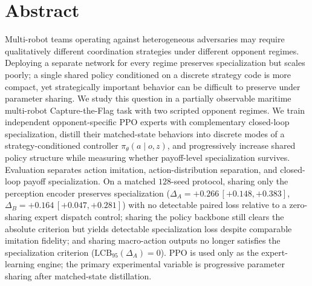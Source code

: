 \section*{Abstract}

Multi-robot teams operating against heterogeneous adversaries may require
qualitatively different coordination strategies under different opponent
regimes. Deploying a separate network for every regime preserves specialization
but scales poorly; a single shared policy conditioned on a discrete strategy
code is more compact, yet strategically important behavior can be difficult to
preserve under parameter sharing. We study this question in a partially
observable maritime multi-robot Capture-the-Flag task with two scripted opponent
regimes. We train independent opponent-specific PPO experts with complementary
closed-loop specialization, distill their matched-state behaviors into discrete
modes of a strategy-conditioned controller $\pi_\theta(a\mid o,z)$, and
progressively increase shared policy structure while measuring whether
payoff-level specialization survives. Evaluation separates action imitation,
action-distribution separation, and closed-loop payoff specialization. On a
matched $128$-seed protocol, sharing only the perception encoder preserves
specialization
($\Delta_A=+0.266\,[+0.148,+0.383]$, $\Delta_B=+0.164\,[+0.047,+0.281]$)
with no detectable paired loss relative to a zero-sharing expert dispatch
control; sharing the policy backbone still clears the absolute criterion but
yields detectable specialization loss despite comparable imitation fidelity; and
sharing macro-action outputs no longer satisfies the specialization criterion
($\mathrm{LCB}_{95}(\Delta_A)=0$). PPO is used only as the expert-learning
engine; the primary experimental variable is progressive parameter sharing after
matched-state distillation.
